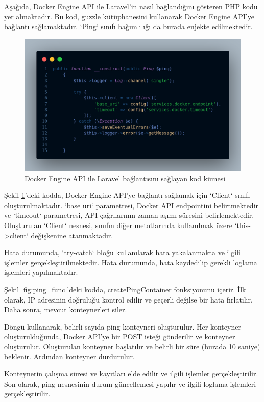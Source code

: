 Aşağıda, Docker Engine API ile Laravel'in nasıl bağlandığını gösteren PHP kodu yer almaktadır. Bu kod, guzzle\cite{guzzle_documentation} kütüphanesini kullanarak Docker Engine API'ye bağlantı sağlamaktadır. `Ping` sınıfı bağımlılığı da burada enjekte edilmektedir.

\begin{figure}[ht]
	\centering
	\includegraphics[width=0.7\linewidth]{images/code_construct.png}
	\caption{Docker Engine API ile Laravel bağlantısını sağlayan kod kümesi}
	\label{fig:ping_construct}
\end{figure}

Şekil \ref{fig:ping_construct}'deki kodda, Docker Engine API'ye bağlantı sağlamak için `Client` sınıfı oluşturulmaktadır. `base uri` parametresi, Docker API endpointini belirtmektedir ve `timeout` parametresi, API çağrılarının zaman aşımı süresini belirlemektedir. Oluşturulan `Client` nesnesi, sınıfın diğer metotlarında kullanılmak üzere `this->client` değişkenine atanmaktadır.

Hata durumunda, `try-catch` bloğu kullanılarak hata yakalanmakta ve ilgili işlemler gerçekleştirilmektedir. Hata durumunda, hata kaydedilip gerekli loglama işlemleri yapılmaktadır.

Şekil \ref{fig:ping_func}'deki kodda, createPingContainer fonksiyonunu içerir. İlk olarak, IP adresinin doğruluğu kontrol edilir ve geçerli değilse bir hata fırlatılır. Daha sonra, mevcut konteynerleri siler.

Döngü kullanarak, belirli sayıda ping konteyneri oluşturulur. Her konteyner oluşturulduğunda, Docker API'ye bir POST isteği gönderilir ve konteyner oluşturulur. Oluşturulan konteyner başlatılır ve belirli bir süre (burada 10 saniye) beklenir. Ardından konteyner durdurulur.

Konteynerin çalışma süresi ve kayıtları elde edilir ve ilgili işlemler gerçekleştirilir. Son olarak, ping nesnesinin durum güncellemesi yapılır ve ilgili loglama işlemleri gerçekleştirilir.

